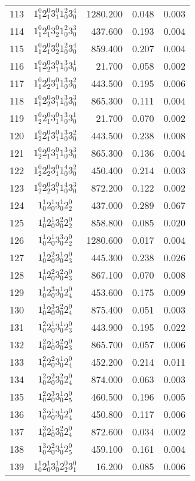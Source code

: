 \documentclass[12pt]{article}
\begin{document}
\begin{table}
\begin{tabular}{rcrrr}
113&$1_1^0 2_1^0 3_1^0 1_0^2 3_0^4$& 1280.200& 0.048& 0.003\\
114&$1_1^0 2_1^0 3_2^0 1_0^2 3_0^3$& 437.600& 0.193& 0.004\\
115&$1_1^0 2_1^0 3_2^0 1_0^2 3_0^4$& 859.400& 0.207& 0.004\\
116&$1_1^0 2_2^0 3_1^0 1_0^3 3_0^1$& 21.700& 0.058& 0.002\\
117&$1_1^0 2_2^0 3_1^0 1_0^3 3_0^2$& 443.500& 0.195& 0.006\\
118&$1_1^0 2_2^0 3_1^0 1_0^3 3_0^3$& 865.300& 0.111& 0.004\\
119&$1_2^0 2_1^0 3_1^0 1_0^3 3_0^1$& 21.700& 0.070& 0.002\\
120&$1_2^0 2_1^0 3_1^0 1_0^3 3_0^2$& 443.500& 0.238& 0.008\\
121&$1_2^0 2_1^0 3_1^0 1_0^3 3_0^3$& 865.300& 0.136& 0.004\\
122&$1_2^0 2_2^0 3_1^0 1_0^4 3_0^2$& 450.400& 0.214& 0.003\\
123&$1_2^0 2_2^0 3_1^0 1_0^4 3_0^3$& 872.200& 0.122& 0.002\\
124&$1_0^1 2_0^1 3_0^1 2_2^0$& 437.000& 0.289& 0.067\\
125&$1_0^1 2_0^1 3_0^2 2_2^0$& 858.800& 0.085& 0.020\\
126&$1_0^1 2_0^1 3_0^3 2_2^0$& 1280.600& 0.017& 0.004\\
127&$1_0^1 2_0^2 3_0^1 2_3^0$& 445.300& 0.238& 0.026\\
128&$1_0^1 2_0^2 3_0^2 2_3^0$& 867.100& 0.070& 0.008\\
129&$1_0^1 2_0^3 3_0^1 2_4^0$& 453.600& 0.175& 0.009\\
130&$1_0^1 2_0^3 3_0^2 2_4^0$& 875.400& 0.051& 0.003\\
131&$1_0^2 2_0^1 3_0^1 2_3^0$& 443.900& 0.195& 0.022\\
132&$1_0^2 2_0^1 3_0^2 2_3^0$& 865.700& 0.057& 0.006\\
133&$1_0^2 2_0^2 3_0^1 2_4^0$& 452.200& 0.214& 0.011\\
134&$1_0^2 2_0^2 3_0^2 2_4^0$& 874.000& 0.063& 0.003\\
135&$1_0^2 2_0^3 3_0^1 2_5^0$& 460.500& 0.196& 0.005\\
136&$1_0^3 2_0^1 3_0^1 2_4^0$& 450.800& 0.117& 0.006\\
137&$1_0^3 2_0^1 3_0^2 2_4^0$& 872.600& 0.034& 0.002\\
138&$1_0^3 2_0^2 3_0^1 2_5^0$& 459.100& 0.161& 0.004\\
139&$1_0^1 2_0^1 3_0^1 2_2^0 3_1^0$& 16.200& 0.085& 0.006\\

\end{tabular}
\end{table}
\end{document}
